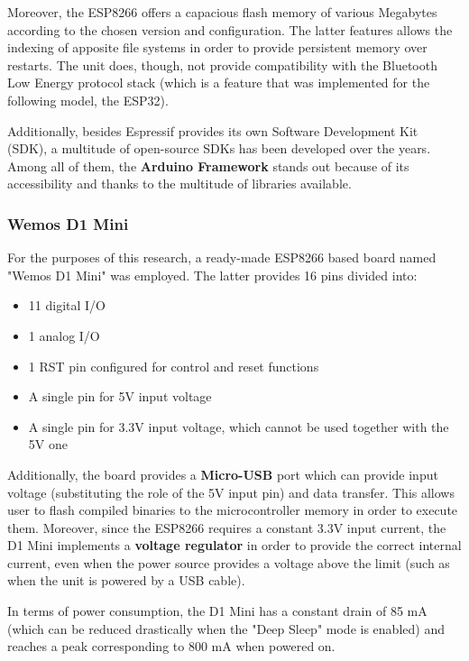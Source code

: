 Moreover, the ESP8266 offers a capacious flash memory of various Megabytes according to the chosen version and configuration. The latter features allows the indexing of apposite file systems in order to provide persistent memory over restarts. The unit does, though, not provide compatibility with the Bluetooth Low Energy protocol stack (which is a feature that was implemented for the following model, the ESP32).

Additionally, besides Espressif provides its own Software Development Kit (SDK), a multitude of open-source SDKs has been developed over the years. Among all of them, the \textbf{Arduino Framework} stands out because of its accessibility and thanks to the multitude of libraries available. 

\subsubsection{Wemos D1 Mini}\label{subsubsec:d1mini}

For the purposes of this research, a ready-made ESP8266 based board named "Wemos D1 Mini" was employed. The latter provides 16 pins divided into:

\begin{itemize}
    \item 11 digital I/O
    \item 1 analog I/O
    \item 1 RST pin configured for control and reset functions
    \item A single pin for 5V input voltage
    \item A single pin for 3.3V input voltage, which cannot be used together with the 5V one
\end{itemize}

Additionally, the board provides a \textbf{Micro-USB} port which can provide input voltage (substituting the role of the 5V input pin) and data transfer. This allows user to flash compiled binaries to the microcontroller memory in order to execute them. Moreover, since the ESP8266 requires a constant 3.3V input current, the D1 Mini implements a \textbf{voltage regulator} in order to provide the correct internal current, even when the power source provides a voltage above the limit (such as when the unit is powered by a USB cable).

In terms of power consumption, the D1 Mini has a constant drain of 85 mA (which can be reduced drastically when the "Deep Sleep" mode is enabled) and reaches a peak corresponding to 800 mA when powered on.

